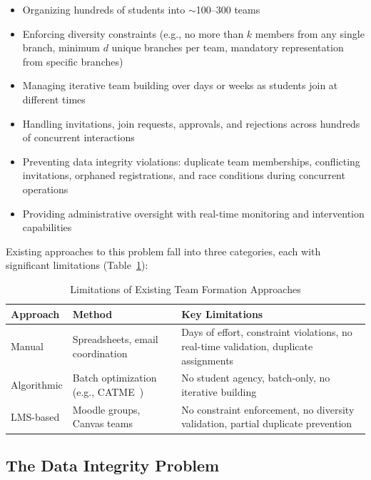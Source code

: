 \documentclass[conference]{IEEEtran}
\begin{document}
\begin{itemize}[noitemsep,topsep=3pt]
    \item Organizing hundreds of students into $\sim$100--300 teams
    \item Enforcing diversity constraints (e.g., no more than $k$ members from any single branch, minimum $d$ unique branches per team, mandatory representation from specific branches)
    \item Managing iterative team building over days or weeks as students join at different times
    \item Handling invitations, join requests, approvals, and rejections across hundreds of concurrent interactions
    \item Preventing data integrity violations: duplicate team memberships, conflicting invitations, orphaned registrations, and race conditions during concurrent operations
    \item Providing administrative oversight with real-time monitoring and intervention capabilities
\end{itemize}

Existing approaches to this problem fall into three categories, each with significant limitations (Table~\ref{tab:approaches}):

\begin{table}[htbp]
\centering
\caption{Limitations of Existing Team Formation Approaches}
\label{tab:approaches}
\footnotesize
\renewcommand{\arraystretch}{1.15}
\begin{tabular}{@{}p{1.5cm}p{2.5cm}p{2.5cm}@{}}
\toprule
\textbf{Approach} & \textbf{Method} & \textbf{Key Limitations} \\
\midrule
Manual & Spreadsheets, email coordination & Days of effort, constraint violations, no real-time validation, duplicate assignments \\
Algorithmic & Batch optimization (e.g., CATME~\cite{ohland2012}) & No student agency, batch-only, no iterative building \\
LMS-based & Moodle groups, Canvas teams~\cite{moodle} & No constraint enforcement, no diversity validation, partial duplicate prevention \\
\bottomrule
\end{tabular}
\end{table}

\subsection{The Data Integrity Problem}
\end{document}

